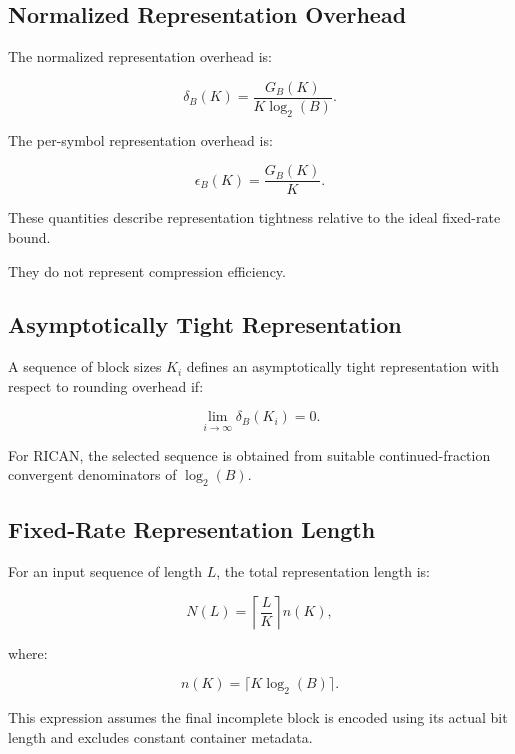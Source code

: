\documentclass[onecolumn]{IEEEtran}
\begin{document}
\subsection{Normalized Representation Overhead}

\begin{definition}

The normalized representation overhead is:

\[
\delta_B(K)
=
\frac{G_B(K)}
{K\log_2(B)} .
\]

The per-symbol representation overhead is:

\[
\epsilon_B(K)
=
\frac{G_B(K)}{K}.
\]

These quantities describe representation tightness relative to the
ideal fixed-rate bound.

They do not represent compression efficiency.

\end{definition}

\subsection{Asymptotically Tight Representation}

\begin{definition}

A sequence of block sizes $K_i$ defines an asymptotically tight
representation with respect to rounding overhead if:

\[
\lim_{i\rightarrow\infty}
\delta_B(K_i)=0 .
\]

For RICAN, the selected sequence is obtained from suitable
continued-fraction convergent denominators of $\log_2(B)$.

\end{definition}

\subsection{Fixed-Rate Representation Length}

For an input sequence of length $L$, the total representation length
is:

\[
N(L)=
\left\lceil\frac{L}{K}\right\rceil n(K),
\]

where:

\[
n(K)=\lceil K\log_2(B)\rceil .
\]

This expression assumes the final incomplete block is encoded using
its actual bit length and excludes constant container metadata.
\end{document}
